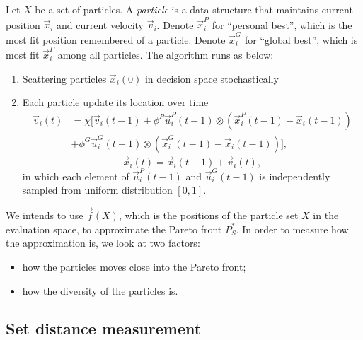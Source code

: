 \documentclass[12pt]{article}
\begin{document}
\begin{mydef}
\label{def:pso}

Let $ X $ be a set of particles.  
A \emph{particle} is a data structure that maintains current position $ \vec{x}_{i} $ and current velocity  $ \vec{v}_{i} $.
Denote $ \vec{x}^{P}_{i} $ for ``personal best'', which is the most fit position remembered of a particle. 
Denote $ \vec{x}^{G}_{i} $ for ``global best'', which is most fit $ \vec{x}^{P}_{i} $ among all particles. 
The algorithm runs as below:
\begin{enumerate}
\item Scattering particles $ \vec{x}_{i}(0) $ in decision space stochastically
\item Each particle update its location over time \\
\begin{equation}
\label{eq:up_vel}
\begin{aligned}
\vec{v}_{i}(t) & = \chi [ \vec{v}_{i}(t-1) + \phi^{P} \vec{u}^{P}_{i}(t-1) \otimes (\vec{x}^{P}_{i}(t-1) - \vec{x}_{i}(t-1)) \\
& + \phi^{G} \vec{u}^{G}_{i}(t-1) \otimes (\vec{x}^{G}_{i}(t-1) - \vec{x}_{i}(t-1)) ],
\end{aligned}
\end{equation}
\begin{equation}
\label{eq:up_pos}
\vec{x}_{i}(t) = \vec{x}_{i}(t-1) + \vec{v}_{i}(t),
\end{equation}
in which each element of $ \vec{u}^{P}_{i}(t-1) $ and $ \vec{u}^{G}_{i}(t-1) $ is independently sampled from uniform distribution $ [0, 1] $.
\end{enumerate}
\end{mydef}

We intends to use $ \vec{f}(X) $, which is the positions of the particle set $ X $ in the evaluation space, to approximate the Pareto front $ P^{*}_{S} $.
In order to measure how the approximation is, we look at two factors:
\begin{itemize}
\item how the particles moves close into the Pareto front;
\item how the diversity of the particles is.
\end{itemize}

\subsection{Set distance measurement}
\end{document}
